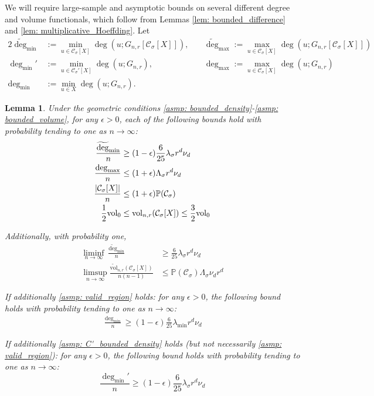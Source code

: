 \documentclass[11pt,twoside]{article}
\newtheorem{lemma}{Lemma}
\DeclarePairedDelimiter\abs{\lvert}{\rvert}
\newcommand{\vol}{\mathrm{vol}}
\newcommand{\1}{\mathbf{1}}
\newcommand{\Xbf}{X}             %
\newcommand{\Pbb}{\mathbb{P}}
\newcommand{\Cset}{\mathcal{C}}
\newcommand{\Csig}{\Cset_{\sigma}}
\newcommand{\degminpr}{\deg_{\min}'}
\newcommand{\degminwt}{\widetilde{\deg}_{\min}}
\newcommand{\degmaxwt}{\widetilde{\deg}_{\max}}
\newcommand{\degmax}{\deg_{\max}}
\newcommand{\degmin}{\deg_{\min}}
\begin{document}
We will require large-sample and asymptotic bounds on several different degree and volume functionals, which follow from Lemmas \ref{lem: bounded_difference} and \ref{lem: multiplicative_Hoeffding}. Let
\begin{alignat*}{2}
\degminwt & := \min_{u \in \Csig[\Xbf]} \deg(u; G_{n,r}\left[\Csig[\Xbf]\right]),~ && \degmaxwt := \max_{u \in \Csig[\Xbf]} \deg(u; G_{n,r}\left[\Csig[\Xbf]\right]) \\ 
\degminpr & := \min_{u \in \Csig'[\Xbf]} \deg(u; G_{n,r}),~ && \degmax := \max_{u \in \Csig[\Xbf]} \deg(u; G_{n,r}) \\
\degmin & := \min_{u \in \Xbf} \deg(u; G_{n,r}).
\end{alignat*}

\begin{lemma}
	\label{lem: ball_bounds_in_probability}
	Under the geometric conditions \ref{asmp: bounded_density}-\ref{asmp: bounded_volume}, for any $\epsilon > 0$, each of the following bounds hold with probability tending to one as $n \to \infty$:
	\begin{align}
	\frac{\degminwt}{n} & \geq (1 - \epsilon)\frac{6}{25} \lambda_{\sigma} r^d \nu_d \label{eqn: min_cluster_degree_bound} \\
	\frac{\degmax}{n} & \leq (1 + \epsilon)\Lambda_{\sigma} r^d \nu_d \label{eqn: max_degree_bound}\\
	\frac{\abs{\Csig[\Xbf]}}{n} & \leq (1 + \epsilon)\Pbb(\Csig) \label{eqn: Csig_cardinality_bound}\\
	\label{eqn: volwt_bound}
	\frac{1}{2}\vol_0 &\leq \vol_{n,r}(\Csig[\Xbf])  \leq \frac{3}{2} \vol_0
	\end{align}
	
	Additionally, with probability one,
	\begin{align}
	\liminf_{n \to \infty} \frac{\degminwt}{n} & \geq \frac{6}{25} \lambda_{\sigma} r^d \nu_d \label{eqn: min_cluster_degree_bound_asymp}\\
	\limsup_{n \to \infty} \frac{\widetilde{\vol}_{n,r}(\Csig[\Xbf])}{n(n-1)} & \leq \Pbb(\Csig) \Lambda_{\sigma} \nu_d r^d \label{eqn: max_vol_bound_asymp}
	\end{align}
	
	If additionally \ref{asmp: valid_region} holds: for any $\epsilon > 0$, the following bound holds with probability tending to one as $n \to \infty$:
	\begin{align}
	\frac{\degmin}{n} \geq (1 - \epsilon)\frac{6}{25}\lambda_{\min} r^d \nu_d \label{eqn: min_degree_bound} 
	\end{align}
	
	If additionally \ref{asmp: C'_bounded_density} holds (but not necessarily \ref{asmp: valid_region}): for any $\epsilon > 0$, the following bound holds with probability tending to one as $n \to \infty$:
	\begin{equation}
	\label{eqn: min_cluster_degree_bound_2}
	\frac{\degminpr}{n} \geq (1 - \epsilon)\frac{6}{25} \lambda_{\sigma} r^d \nu_d
	\end{equation}
\end{lemma}
\end{document}
